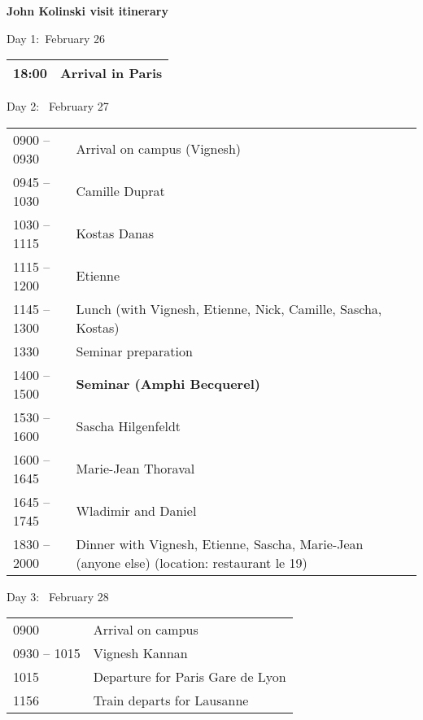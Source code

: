\documentclass[a4paper,11pt,fleqn]{article}
\begin{document}
	\sffamily
	\thispagestyle{titlepage}
	\vspace*{-2em}
	\begin{center}
		\huge \textbf{John Kolinski visit itinerary}
	\end{center}
	\begin{center}
		\Large 
		Day 1:~February 26 \\
		\vspace*{0.5em}
		\begin{tabular}{| p{4cm} p{13cm} |}
			\hline
			18:00 & Arrival in Paris\\
			\hline
		\end{tabular}
		
		Day 2:~ February 27 \\
		\vspace*{0.5em}
		\begin{tabular}{| p{4cm} p{13cm} |}
			\hline
			0900 -- 0930 & Arrival on campus (Vignesh) \\
			0945 -- 1030 & Camille Duprat \\
			1030 -- 1115 & Kostas Danas\\
			1115 -- 1200 &  Etienne  \\
			1145 -- 1300 & Lunch (with Vignesh, Etienne, Nick, Camille, Sascha, Kostas) \\
			1330 & Seminar preparation \\
			1400 -- 1500 & \textbf{Seminar (Amphi Becquerel)} \\ 
			1530 -- 1600 & Sascha Hilgenfeldt \\
			1600 -- 1645 &  Marie-Jean Thoraval \\
			1645 -- 1745 & Wladimir and Daniel \\
			1830 -- 2000 & Dinner with Vignesh, Etienne, Sascha, Marie-Jean (anyone else) (location: restaurant le 19) \\
			\hline
		\end{tabular}
		
		Day 3:~ February 28 \\
		\vspace*{0.5em}
		\begin{tabular}{| p{4cm} p{13cm} |}
			\hline
			0900 & Arrival on campus \\
			0930 -- 1015 &  Vignesh Kannan \\
			1015 & Departure for Paris Gare de Lyon \\
			1156 & Train departs for Lausanne \\
			\hline
		\end{tabular}
	\end{center}
		
\end{document}
